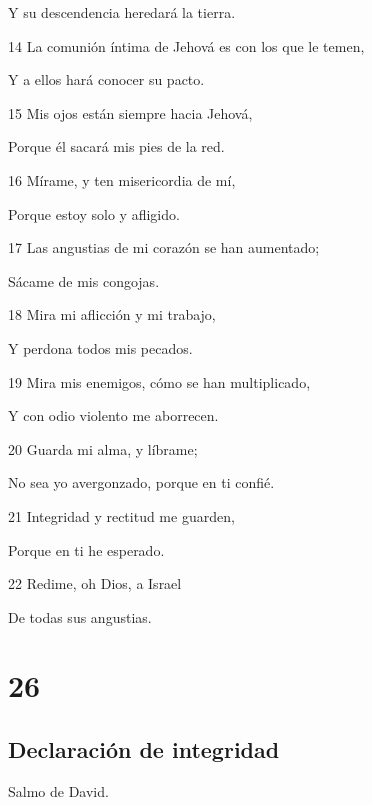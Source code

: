 \par Y su descendencia heredará la tierra.
\par 14 La comunión íntima de Jehová es con los que le temen,
\par Y a ellos hará conocer su pacto.
\par 15 Mis ojos están siempre hacia Jehová,
\par Porque él sacará mis pies de la red.
\par 16 Mírame, y ten misericordia de mí,
\par Porque estoy solo y afligido.
\par 17 Las angustias de mi corazón se han aumentado;
\par Sácame de mis congojas.
\par 18 Mira mi aflicción y mi trabajo,
\par Y perdona todos mis pecados.
\par 19 Mira mis enemigos, cómo se han multiplicado,
\par Y con odio violento me aborrecen.
\par 20 Guarda mi alma, y líbrame;
\par No sea yo avergonzado, porque en ti confié.
\par 21 Integridad y rectitud me guarden,
\par Porque en ti he esperado.
\par 22 Redime, oh Dios, a Israel
\par De todas sus angustias.

\chapter{26}

\section*{Declaración de integridad}

\par Salmo de David.


